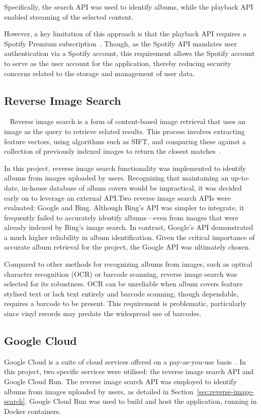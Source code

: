 Specifically, the search API was used to identify albums, while the playback API enabled streaming of the selected content.

However, a key limitation of this approach is that the playback API requires a Spotify Premium subscription~\cite{SpotifyPlaybackSDK}. Though, as the Spotify API mandates user authentication via a Spotify account, this requirement allows the Spotify account to serve as the user account for the application, thereby reducing security concerns related to the storage and management of user data.

\subsection{Reverse Image Search}~\label{sec:reverse-image-search}
Reverse image search is a form of content-based image retrieval that uses an image as the query to retrieve related results. This process involves extracting feature vectors, using algorithms such as SIFT, and comparing these against a collection of previously indexed images to return the closest matches~\cite{Gaillard2017LargeSR}.

In this project, reverse image search functionality was implemented to identify albums from images uploaded by users. Recognizing that maintaining an up-to-date, in-house database of album covers would be impractical, it was decided early on to leverage an external API.\@ Two reverse image search APIs were evaluated: Google and Bing. Although Bing's API was simpler to integrate, it frequently failed to accurately identify albums—even from images that were already indexed by Bing's image search. In contrast, Google's API demonstrated a much higher reliability in album identification. Given the critical importance of accurate album retrieval for the project, the Google API was ultimately chosen.

Compared to other methods for recognizing albums from images, such as optical character recognition (OCR) or barcode scanning, reverse image search was selected for its robustness. OCR can be unreliable when album covers feature stylised text or lack text entirely and barcode scanning, though dependable, requires a barcode to be present. This requirement is problematic, particularly since vinyl records may predate the widespread use of barcodes.

\subsection{Google Cloud}
Google Cloud is a suite of cloud services offered on a pay-as-you-use basis~\cite{GCP}. In this project, two specific services were utilised: the reverse image search API and Google Cloud Run. The reverse image search API was employed to identify albums from images uploaded by users, as detailed in Section~\ref{sec:reverse-image-search}. Google Cloud Run was used to build and host the application, running in Docker containers.

